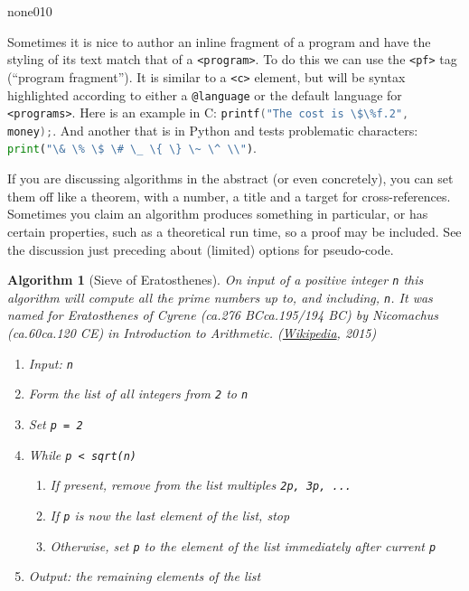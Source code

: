 \documentclass[pdflatex]{sn-jnl}
\theoremstyle{thmstyleone}%
\theoremstyle{thmstyletwo}%
\newtheorem{algorithm}[theorem]{Algorithm}
\theoremstyle{thmstylethree}%
\newcommand{\mono}[1]{\texttt{#1}}
\newcommand{\pubtitle}[1]{\textsl{#1}}
\numberwithin{equation}{section}
\newcommand{\programfragment}[2]{\lstinline[language=#1, style=programcodestyle, basicstyle=\ttfamily]#2}
\begin{document}
\begin{program}{none}{0}{1}{0}

\end{program}
Sometimes it is nice to author an inline fragment of a program and have the styling of its text match that of a \mono{<program>}. To do this we can use the \mono{<pf>} tag (``program fragment'').  It is similar to a \mono{<c>} element, but will be syntax highlighted according to either a \mono{@language} or the default language for \mono{<programs>}. Here is an example in C: \programfragment{C}{`printf("The cost is \$\%f.2", money);`}. And another that is in Python and tests problematic characters: \programfragment{Python}{`print("\& \% \$ \# \_ \{ \} \~ \^ \\")`}.%
\par
If you are discussing algorithms in the abstract (or even concretely), you can set them off like a theorem, with a number, a title and a target for cross-references.  Sometimes you claim an algorithm produces something in particular, or has certain properties, such as a theoretical run time, so a proof may be included.  See the discussion just preceding about (limited) options for pseudo-code.%
\begin{algorithm}[Sieve of Eratosthenes]\label{algorithm-sieve-eratosthenes}%
%
On input of a positive integer \mono{n} this algorithm will compute all the prime numbers up to, and including, \mono{n}.  It was named for Eratosthenes of Cyrene (ca.\@ 276 BC\textendash{}ca.\@ 195\slash{}194 BC) by Nicomachus (ca.\@ 60\textendash{}ca.\@ 120 CE) in \pubtitle{Introduction to Arithmetic}. (\href{http://en.wikipedia.org/wiki/Sieve_of_Eratosthenes}{Wikipedia}\footnotemark{}, 2015)%
\begin{enumerate}
\item{}Input: \mono{n}%
\item{}Form the list of all integers from \mono{2} to \mono{n}%
\item{}Set \mono{p = 2}%
\item{}While \mono{p < sqrt(n)}%
\begin{enumerate}[label={\arabic*.}]
\item{}If present, remove from the list multiples \mono{2p, 3p, ...}%
\item{}If \mono{p} is now the last element of the list, stop%
\item{}Otherwise, set \mono{p} to the element of the list immediately after current \mono{p}%
\end{enumerate}
%
\item{}Output: the remaining elements of the list%
\end{enumerate}
%
\end{algorithm}
\end{document}
